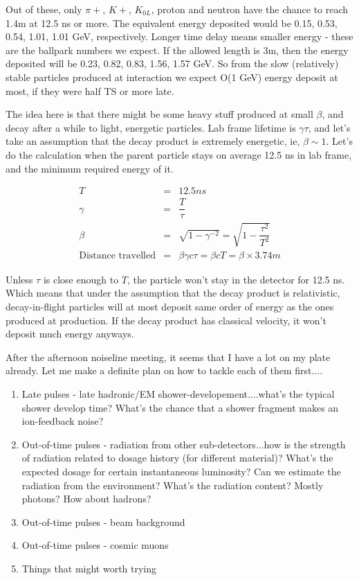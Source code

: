 Out of these, only $\pi+$, $K+$, $K_{0L}$, proton and neutron have the chance to reach 1.4m at 12.5 ns or more.
The equivalent energy deposited would be 0.15, 0.53, 0.54, 1.01, 1.01 GeV, respectively.
Longer time delay means smaller energy - these are the ballpark numbers we expect.
If the allowed length is 3m, then the energy deposited will be 0.23, 0.82, 0.83, 1.56, 1.57 GeV.
So from the slow (relatively) stable particles produced at interaction
we expect O(1 GeV) energy deposit at most, if they were half TS or more late.


The idea here is that there might be some heavy stuff produced at small $\beta$, and decay after a while to light, energetic particles.
Lab frame lifetime is $\gamma \tau$, and let's take an assumption that the decay product is extremely energetic, ie, $\beta \sim 1$.
Let's do the calculation when the parent particle stays on average 12.5 ns in lab frame, and the minimum required energy of it.

\begin{eqnarray}
T &=& 12.5 ns\nonumber\\
\gamma &=& \dfrac{T}{\tau}\nonumber\\
\beta &=& \sqrt{1 - \gamma^{-2}} = \sqrt{1 - \dfrac{\tau^2}{T^2}}\nonumber\\
\text{Distance travelled} &=& \beta \gamma c \tau = \beta c T = \beta \times 3.74 m\nonumber
\end{eqnarray}

Unless $\tau$ is close enough to $T$, the particle won't stay in the detector for 12.5 ns.  Which means that under the assumption that
the decay product is relativistic, decay-in-flight particles will at most deposit same order of energy as the ones produced at production.
If the decay product has classical velocity, it won't deposit much energy anyways.


After the afternoon noiseline meeting, it seems that I have a lot on my plate already.  Let me make a definite plan on how to tackle each of them first....

\begin{enumerate}
\item Late pulses - late hadronic/EM shower-developement....what's the typical shower develop time?  What's the chance that a shower fragment makes an ion-feedback noise?
\item Out-of-time pulses - radiation from other sub-detectors...how is the strength of radiation related to dosage history (for different material)?  What's the expected dosage for certain
instantaneous luminosity?  Can we estimate the radiation from the environment?  What's the radiation content?  Mostly photons?  How about hadrons?
\item Out-of-time pulses - beam background
\item Out-of-time pulses - cosmic muons
\item Things that might worth trying
\end{enumerate}

